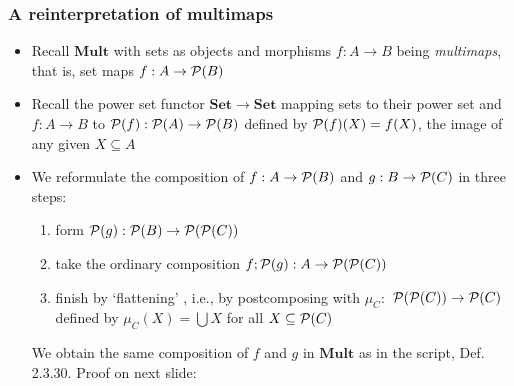 \documentclass[handout]{beamer}
\newcommand{\bfsf}[1]{{\boldsymbol{#1}}}
\newcommand{\Set}{\bfsf{Set}}
\newcommand{\Mult}{\bfsf{Mult}}
\begin{document}
\frame
  {   
    \frametitle{A reinterpretation of multimaps}\label{Mon5:MultiMapReint}

 \begin{itemize}[<+->]
\item Recall $\Mult$ with sets as objects and morphisms $f:A\to B$ being
\emph{multimaps}, that is, set maps $f: A\to \operatorname{\mathcal{P}}(B)$
\item Recall the power set functor $\Set\to\Set$ mapping sets to their power set
and $f:A\to B$  to $\operatorname{\mathcal{P}}(f) : \operatorname{\mathcal{P}}(A) \to \operatorname{\mathcal{P}}(B)$ defined by $\operatorname{\mathcal{P}}(f)(X) = f(X)$, the {\color{red}image} of any given $X\subseteq A$
\item We reformulate the composition of $f:A\to \operatorname{\mathcal{P}}(B)$ and $g:B\to \operatorname{\mathcal{P}}(C)$
in three steps:
 \begin{enumerate}
    \item form $\operatorname{\mathcal{P}}(g) : \operatorname{\mathcal{P}}(B) \to \operatorname{\mathcal{P}}(\operatorname{\mathcal{P}}(C))$
    \item take the ordinary composition $f;\operatorname{\mathcal{P}}(g) : A \to \operatorname{\mathcal{P}}(\operatorname{\mathcal{P}}(C))$
    \item finish by `flattening' , i.e., by postcomposing with 
$\mu_C:$ $\operatorname{\mathcal{P}}(\operatorname{\mathcal{P}}(C)) \to \operatorname{\mathcal{P}}(C) $ defined by 
$\mu_C(X) = \bigcup X$ for all $X\subseteq\operatorname{\mathcal{P}}(C)$
 \end{enumerate}
We obtain the same composition of $f$ and $g$ in $\Mult$ as in the script, Def. 2.3.30.
Proof on next slide:
 \end{itemize}

 }
\end{document}
